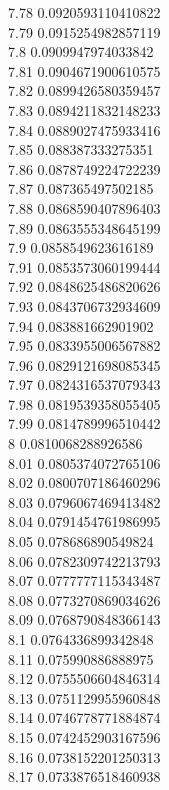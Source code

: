 {7.78	0.0920593110410822\\
7.79	0.0915254982857119\\
7.8	0.0909947974033842\\
7.81	0.0904671900610575\\
7.82	0.0899426580359457\\
7.83	0.0894211832148233\\
7.84	0.0889027475933416\\
7.85	0.088387333275351\\
7.86	0.0878749224722239\\
7.87	0.087365497502185\\
7.88	0.0868590407896403\\
7.89	0.0863555348645199\\
7.9	0.0858549623616189\\
7.91	0.0853573060199444\\
7.92	0.0848625486820626\\
7.93	0.0843706732934609\\
7.94	0.083881662901902\\
7.95	0.0833955006567882\\
7.96	0.0829121698085345\\
7.97	0.0824316537079343\\
7.98	0.0819539358055405\\
7.99	0.0814789996510442\\
8	0.0810068288926586\\
8.01	0.0805374072765106\\
8.02	0.0800707186460296\\
8.03	0.0796067469413482\\
8.04	0.0791454761986995\\
8.05	0.078686890549824\\
8.06	0.0782309742213793\\
8.07	0.0777777115343487\\
8.08	0.0773270869034626\\
8.09	0.0768790848366143\\
8.1	0.0764336899342848\\
8.11	0.075990886888975\\
8.12	0.0755506604846314\\
8.13	0.0751129955960848\\
8.14	0.0746778771884874\\
8.15	0.0742452903167596\\
8.16	0.0738152201250313\\
8.17	0.0733876518460938\\
}
